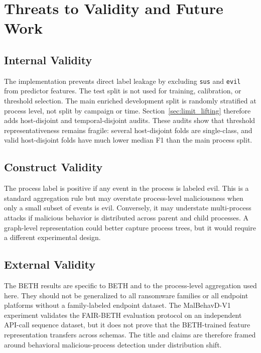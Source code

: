\documentclass[10pt,journal,compsoc]{IEEEtran}
\begin{document}
\section{Threats to Validity and Future Work}
\label{sec:validity}

\subsection{Internal Validity}

The implementation prevents direct label leakage by excluding \texttt{sus} and \texttt{evil} from predictor features. The test split is not used for training, calibration, or threshold selection. The main enriched development split is randomly stratified at process level, not split by campaign or time. Section~\ref{sec:limit_lifting} therefore adds host-disjoint and temporal-disjoint audits. These audits show that threshold representativeness remains fragile: several host-disjoint folds are single-class, and valid host-disjoint folds have much lower median F1 than the main process split.

\subsection{Construct Validity}

The process label is positive if any event in the process is labeled evil. This is a standard aggregation rule but may overstate process-level maliciousness when only a small subset of events is evil. Conversely, it may understate multi-process attacks if malicious behavior is distributed across parent and child processes. A graph-level representation could better capture process trees, but it would require a different experimental design.

\subsection{External Validity}

The BETH results are specific to BETH and to the process-level aggregation used here. They should not be generalized to all ransomware families or all endpoint platforms without a family-labeled endpoint dataset. The MalBehavD-V1 experiment validates the FAIR-BETH evaluation protocol on an independent API-call sequence dataset, but it does not prove that the BETH-trained feature representation transfers across schemas. The title and claims are therefore framed around behavioral malicious-process detection under distribution shift.
\end{document}
